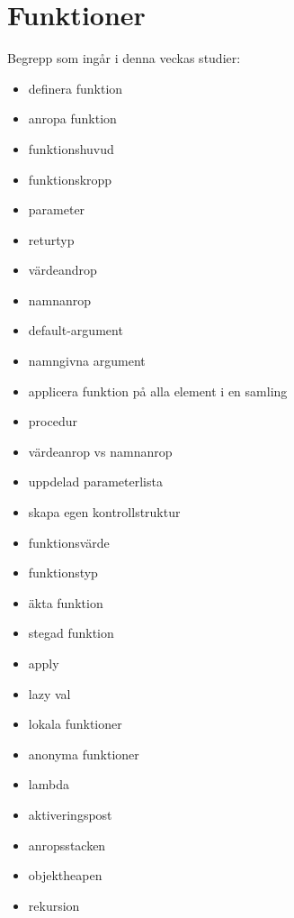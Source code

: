 \chapter{Funktioner}\label{chapter:W03}
Begrepp som ingår i denna veckas studier:
\begin{itemize}[noitemsep,label={$\square$},leftmargin=*]
\item definera funktion
\item anropa funktion
\item funktionshuvud
\item funktionskropp
\item parameter
\item returtyp
\item värdeandrop
\item namnanrop
\item default-argument
\item namngivna argument
\item applicera funktion på alla element i en samling
\item procedur
\item värdeanrop vs namnanrop
\item uppdelad parameterlista
\item skapa egen kontrollstruktur
\item funktionsvärde
\item funktionstyp
\item äkta funktion
\item stegad funktion
\item apply
\item lazy val
\item lokala funktioner
\item anonyma funktioner
\item lambda
\item aktiveringspost
\item anropsstacken
\item objektheapen
\item rekursion\end{itemize}
